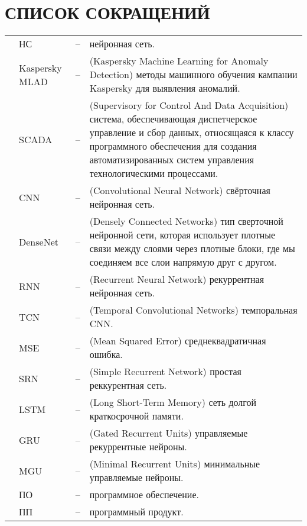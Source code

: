 \sectionbreak \section*{ 
    \gostTitleFont
    \redline
    СПИСОК СОКРАЩЕНИЙ
}
\titlespace

{\gostFont

\begin{tabular}{p{0.85cm} p{1.75cm} p{0.3cm} p{131.5mm}}
    & НС & {--} & нейронная сеть. \\
    & Kaspersky MLAD & {--} & (Kaspersky Machine Learning for Anomaly Detection) методы машинного обучения кампании Kaspersky для выявления аномалий. \\
    & SCADA & {--} & (Supervisory for Control And Data Acquisition) система, обеспечивающая диспетчерское управление и сбор данных, относящаяся к классу программного обеспечения для создания автоматизированных систем управления технологическими процессами. \\
    & CNN & {--} & (Convolutional Neural Network) свёрточная нейронная сеть. \\
    & DenseNet & {--} & (Densely Connected Networks) тип сверточной нейронной сети, которая использует плотные связи между слоями через плотные блоки, где мы соединяем все слои напрямую друг с другом. \\
    & RNN & {--} & (Recurrent Neural Network) рекуррентная нейронная сеть. \\
    & TCN & {--} & (Temporal Convolutional Networks) темпоральная CNN. \\
    & MSE & {--} & (Mean Squared Error) среднеквадратичная ошибка. \\
    & SRN & {--} & (Simple Recurrent Network) простая реккурентная сеть. \\
    & LSTM & {--} & (Long Short-Term Memory) сеть долгой краткосрочной памяти. \\
    & GRU & {--} & (Gated Recurrent Units) управляемые рекуррентные нейроны. \\
    & MGU & {--} & (Minimal Recurrent Units) минимальные управляемые нейроны. \\
    & ПО & {--} & программное обеспечение. \\
    & ПП & {--} & программный продукт. \\
\end{tabular}

}
